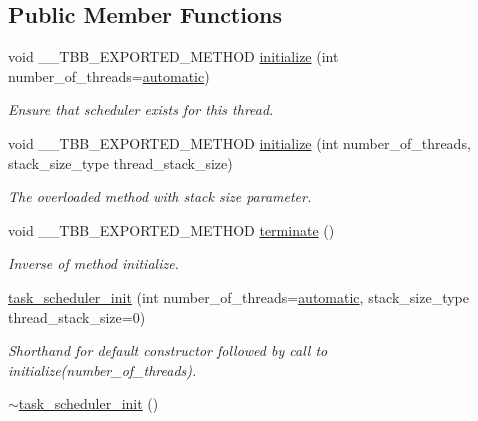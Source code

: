 \subsection*{Public Member Functions}
\begin{DoxyCompactItemize}
\item 
void \+\_\+\+\_\+\+T\+B\+B\+\_\+\+E\+X\+P\+O\+R\+T\+E\+D\+\_\+\+M\+E\+T\+H\+O\+D \hyperlink{classtbb_1_1task__scheduler__init_a22ca8b871fa96e8fed1d2336616662d9}{initialize} (int number\+\_\+of\+\_\+threads=\hyperlink{classtbb_1_1task__scheduler__init_a945886f5ef48300a8ebff2d077c166b1}{automatic})
\begin{DoxyCompactList}\small\item\em Ensure that scheduler exists for this thread. \end{DoxyCompactList}\item 
void \+\_\+\+\_\+\+T\+B\+B\+\_\+\+E\+X\+P\+O\+R\+T\+E\+D\+\_\+\+M\+E\+T\+H\+O\+D \hyperlink{classtbb_1_1task__scheduler__init_a786a7c6c49faa40101d5f4ca2209b1cb}{initialize} (int number\+\_\+of\+\_\+threads, stack\+\_\+size\+\_\+type thread\+\_\+stack\+\_\+size)
\begin{DoxyCompactList}\small\item\em The overloaded method with stack size parameter. \end{DoxyCompactList}\item 
\hypertarget{classtbb_1_1task__scheduler__init_afcd615b84c2f57d7ada13813a8443ecf}{}void \+\_\+\+\_\+\+T\+B\+B\+\_\+\+E\+X\+P\+O\+R\+T\+E\+D\+\_\+\+M\+E\+T\+H\+O\+D \hyperlink{classtbb_1_1task__scheduler__init_afcd615b84c2f57d7ada13813a8443ecf}{terminate} ()\label{classtbb_1_1task__scheduler__init_afcd615b84c2f57d7ada13813a8443ecf}

\begin{DoxyCompactList}\small\item\em Inverse of method initialize. \end{DoxyCompactList}\item 
\hypertarget{classtbb_1_1task__scheduler__init_a8b2657d9b7c39fede2d19507d0e94688}{}\hyperlink{classtbb_1_1task__scheduler__init_a8b2657d9b7c39fede2d19507d0e94688}{task\+\_\+scheduler\+\_\+init} (int number\+\_\+of\+\_\+threads=\hyperlink{classtbb_1_1task__scheduler__init_a945886f5ef48300a8ebff2d077c166b1}{automatic}, stack\+\_\+size\+\_\+type thread\+\_\+stack\+\_\+size=0)\label{classtbb_1_1task__scheduler__init_a8b2657d9b7c39fede2d19507d0e94688}

\begin{DoxyCompactList}\small\item\em Shorthand for default constructor followed by call to initialize(number\+\_\+of\+\_\+threads). \end{DoxyCompactList}\item 
\hypertarget{classtbb_1_1task__scheduler__init_a20b121334ec39c1d91bd4fe9a51892b0}{}\hyperlink{classtbb_1_1task__scheduler__init_a20b121334ec39c1d91bd4fe9a51892b0}{$\sim$task\+\_\+scheduler\+\_\+init} ()\label{classtbb_1_1task__scheduler__init_a20b121334ec39c1d91bd4fe9a51892b0}


\end{DoxyCompactItemize}
